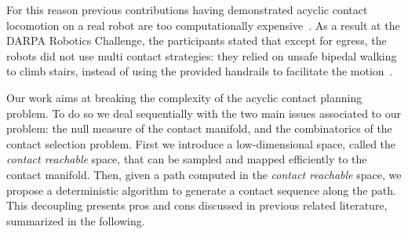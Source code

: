 \documentclass[journal]{IEEEtran}
\begin{document}
For this reason previous contributions having demonstrated acyclic contact locomotion on a real robot are too computationally expensive~\citep{Bretl:2006:MPM:1124573.1124585}. As a result at the DARPA Robotics Challenge, the participants stated that except for egress, the robots did not use multi contact strategies: they relied on unsafe bipedal walking to climb stairs, instead of using the provided handrails to facilitate the motion~\citep{atkensondarpa}. 

 Our work aims at breaking the complexity of the acyclic contact planning problem.  To do so we deal sequentially with the two main issues associated to our problem: the null measure of the contact manifold, and the combinatorics of the contact selection problem. First we introduce a low-dimensional space, called the \textit{contact reachable} space, that can be sampled and mapped efficiently to the contact manifold. Then, given a path computed in the \textit{contact reachable} space, we propose a deterministic algorithm to generate a contact sequence along the path.
This decoupling presents pros and cons discussed in previous related literature, summarized in the following.

\end{document}

